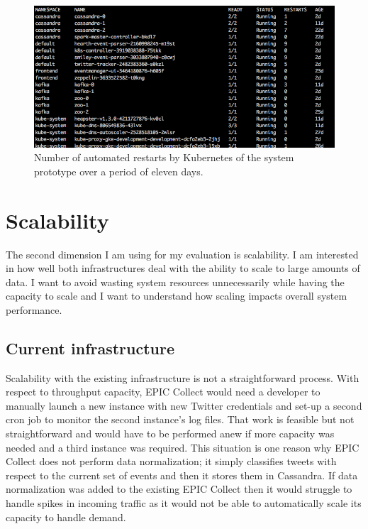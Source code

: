 \begin{figure}
\centering
\includegraphics[width=\textwidth]{Figures/pods}
\decoRule
\caption[Kubernets restarts in eleven days]{Number of automated restarts by Kubernetes of the system prototype over a period of eleven days.}
\label{fig:pods}
\end{figure}

\section{Scalability}

The second dimension I am using for my evaluation is scalability. I am interested in how well both infrastructures deal with the ability to scale to large amounts of data. I want to avoid wasting system resources unnecessarily while having the capacity to scale and I want to understand how scaling impacts overall system performance.

\subsection{Current infrastructure}

Scalability with the existing infrastructure is not a straightforward process. With respect to throughput capacity, EPIC Collect would need a developer to manually launch a new instance with new Twitter credentials and set-up a second cron job to monitor the second instance’s log files. That work is feasible but not straightforward and would have to be performed anew if more capacity was needed and a third instance was required. This situation is one reason why EPIC Collect does not perform data normalization; it simply classifies tweets with respect to the current set of events and then it stores them in Cassandra. If data normalization was added to the existing EPIC Collect then it would struggle to handle spikes in incoming traffic as it would not be able to automatically scale its capacity to handle demand.

